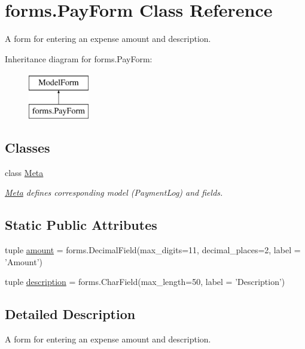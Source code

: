\hypertarget{classforms_1_1_pay_form}{\section{forms.\-Pay\-Form Class Reference}
\label{classforms_1_1_pay_form}
}


A form for entering an expense amount and description.  


Inheritance diagram for forms.\-Pay\-Form\-:\begin{figure}[H]
\begin{center}
\leavevmode
\includegraphics[height=2.000000cm]{classforms_1_1_pay_form}
\end{center}
\end{figure}
\subsection*{Classes}
\begin{DoxyCompactItemize}
\item 
class \hyperlink{classforms_1_1_pay_form_1_1_meta}{Meta}
\begin{DoxyCompactList}\small\item\em \hyperlink{classforms_1_1_pay_form_1_1_meta}{Meta} defines corresponding model (Payment\-Log) and fields. \end{DoxyCompactList}\end{DoxyCompactItemize}
\subsection*{Static Public Attributes}
\begin{DoxyCompactItemize}
\item 
tuple \hyperlink{classforms_1_1_pay_form_a5d1483bf91d02813dc5e452d98beb013}{amount} = forms.\-Decimal\-Field(max\-\_\-digits=11, decimal\-\_\-places=2, label = 'Amount')
\item 
tuple \hyperlink{classforms_1_1_pay_form_a39a3a28d0b444a5e47b103b7fe36c476}{description} = forms.\-Char\-Field(max\-\_\-length=50, label = 'Description')
\end{DoxyCompactItemize}


\subsection{Detailed Description}
A form for entering an expense amount and description. 

